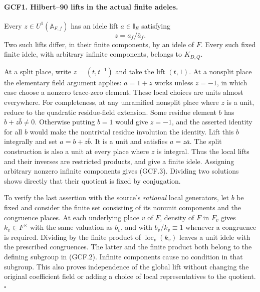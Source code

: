 \paragraph{GCF1. Hilbert--90 lifts in the actual finite adeles.}
\label{claim:GCF1}
Every \(z\in U^1(\mathbb A_{F,f})\) has an idele lift \(a\in
\mathbb I_E\) satisfying
\[
                         z=a_f/\bar a_f.             \tag{GCF.3}
\]
Two such lifts differ, in their finite components, by an idele of
\(F\).  Every such fixed finite idele, with arbitrary infinite
components, belongs to \(K_{D,Q}\).

At a split place, write \(z=(t,t^{-1})\) and take the lift
\((t,1)\).  At a nonsplit place the elementary field argument applies:
\(a=1+z\) works unless \(z=-1\), in which case choose a nonzero
trace-zero element.  These local choices are units almost everywhere.
For completeness, at any unramified nonsplit place where \(z\) is a
unit, reduce to the quadratic residue-field extension.  Some residue
element \(b\) has \(b+z\bar b\ne0\).  Otherwise putting \(b=1\)
would give \(z=-1\), and the asserted identity for all \(b\) would
make the nontrivial residue involution the identity.  Lift this \(b\)
integrally and set \(a=b+z\bar b\).  It is a unit and satisfies
\(a=z\bar a\).  The split construction is also a unit at every
place where \(z\) is integral.  Thus the local lifts and their inverses
are restricted products, and give a finite idele.  Assigning arbitrary
nonzero infinite components gives (GCF.3).  Dividing two solutions
shows directly that their quotient is fixed by conjugation.

To verify the last assertion with the source's \emph{rational} local
generators, let \(b\) be fixed and consider the finite set consisting
of its nonunit components and the congruence places.  At each underlying
place \(v\) of \(F\), density of \(F\) in \(F_v\) gives
\(k_v\in F^{\times}\) with the same valuation as \(b_v\), and with
\(b_v/k_v\equiv1\) whenever a congruence is required.  Dividing by
the finite product of \(\operatorname{loc}_v(k_v)\) leaves a unit
idele with the prescribed congruences.  The latter and the finite
product both belong to the defining subgroup in (GCF.2).
Infinite components cause no condition in that subgroup.  This also
proves independence of the global lift without changing the original
coefficient field or adding a choice of local representatives to the
quotient.
\hfill\(\square\)

